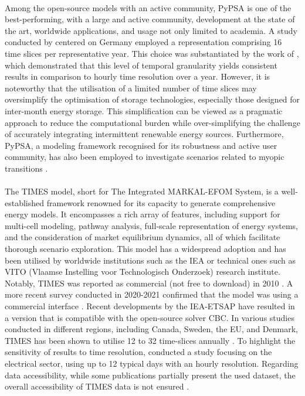 \\

\noindent
Among the open-source models with an active community, PyPSA is one of the best-performing, with a large and active community, development at the state of the art, worldwide applications, and usage not only limited to academia. A study conducted by \citet{bartholdsen2019pathways} centered on Germany employed a representation comprising 16 time slices per representative year. This choice was substantiated by the work of \citet{welsch2014incorporating}, which demonstrated that this level of temporal granularity yields consistent results in comparison to hourly time resolution over a year. However, it is noteworthy that the utilisation of a limited number of time slices may oversimplify the optimisation of storage technologies, especially those designed for inter-month energy storage. This simplification can be viewed as a pragmatic approach to reduce the computational burden while over-simplifying the challenge of accurately integrating intermittent renewable energy sources. Furthermore, PyPSA, a modeling framework recognised for its robustness and active user community, has also been employed to investigate scenarios related to myopic transitions \cite{pedersen2022long}. \\

\\

\noindent
The TIMES model, short for The Integrated MARKAL-EFOM System, is a well-established framework renowned for its capacity to generate comprehensive energy models. It encompasses a rich array of features, including support for multi-cell modeling, pathway analysis, full-scale representation of energy systems, and the consideration of market equilibrium dynamics, all of which facilitate thorough scenario exploration. This model has a widespread adoption and has been utilised by worldwide institutions such as the \gls{IEA} or technical ones such as VITO (Vlaamse Instelling voor Technologisch Onderzoek) research institute. Notably, TIMES was reported as commercial (\ie not free to download) in 2010 \cite{Connolly2010}. A more recent survey conducted in 2020-2021 confirmed that the model was using a commercial interface \cite{chang2021trends}. Recent developments by the IEA-ETSAP have resulted in a version that is compatible with the open-source solver CBC. In various studies conducted in different regions, including Canada, Sweden, the EU, and Denmark, TIMES has been shown to utilise 12 to 32 time-slices annually \cite{prina2020classification}. To highlight the sensitivity of results to time resolution, \citet{haydt2011relevance} conducted a study focusing on the electrical sector, using up to 12 typical days with an hourly resolution. Regarding data accessibility, while some publications partially present the used dataset, the overall accessibility of TIMES data is not ensured \cite{openmod_times_description}. \\


